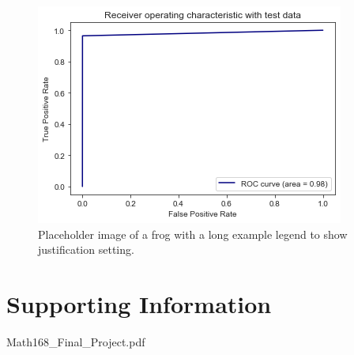 \documentclass[9pt,twoside]{pnas-new}
\begin{document}
\begin{figure}%
    \centering
    \includegraphics[width=.8\linewidth]{Figures/pa_roc_curve.png}
    \caption{Placeholder image of a frog with a long example legend to show justification setting.}
    \label{fig:pa_roc_curve}
\end{figure}

\section*{Supporting Information}


\showacknow %



\clearpage

{Math168_Final_Project.pdf}
\end{document}
